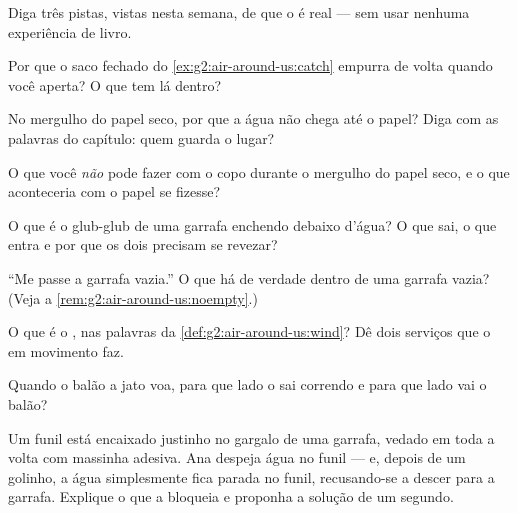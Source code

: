 \begin{exercise}[$\star$]\label{exo:g2:air-around-us:1}
Diga três pistas, vistas nesta semana, de que o  é real --- sem
usar nenhuma experiência de livro.
\end{exercise}

\begin{exercise}[$\star$]\label{exo:g2:air-around-us:2}
Por que o saco fechado do \cref{ex:g2:air-around-us:catch} empurra de
volta quando você aperta? O que tem lá dentro?
\end{exercise}

\begin{exercise}[$\star$]\label{exo:g2:air-around-us:3}
No mergulho do papel seco, por que a água não chega até o papel? Diga
com as palavras do capítulo: quem guarda o lugar?
\end{exercise}

\begin{exercise}[$\star$]\label{exo:g2:air-around-us:4}
O que você \emph{não} pode fazer com o copo durante o mergulho do
papel seco, e o que aconteceria com o papel se fizesse?
\end{exercise}

\begin{exercise}[$\star$]\label{exo:g2:air-around-us:5}
O que é o glub-glub de uma garrafa enchendo debaixo d'água? O que sai,
o que entra e por que os dois precisam se revezar?
\end{exercise}

\begin{exercise}[$\star$]\label{exo:g2:air-around-us:6}
``Me passe a garrafa vazia.'' O que há de verdade dentro de uma
garrafa vazia? (Veja a \cref{rem:g2:air-around-us:noempty}.)
\end{exercise}

\begin{exercise}[$\star$]\label{exo:g2:air-around-us:7}
O que é o , nas palavras da \cref{def:g2:air-around-us:wind}? Dê
dois serviços que o  em movimento faz.
\end{exercise}

\begin{exercise}[$\star$]\label{exo:g2:air-around-us:8}
Quando o balão a jato voa, para que lado o  sai correndo e para que
lado vai o balão?
\end{exercise}

\begin{exercise}[$\star\star$]\label{exo:g2:air-around-us:9}
Um funil está encaixado justinho no gargalo de uma garrafa, vedado em
toda a volta com massinha adesiva. Ana despeja água no funil --- e,
depois de um golinho, a água simplesmente fica parada no funil,
recusando-se a descer para a garrafa. Explique o que a bloqueia e
proponha a solução de um segundo.
\end{exercise}


